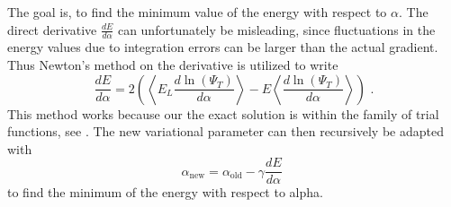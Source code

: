 The goal is, to find the minimum value of the energy with respect to $\alpha$. The direct derivative $\frac{dE}{d\alpha}$ can unfortunately be misleading, since fluctuations in the energy values due to integration errors can be larger than the actual gradient. Thus Newton's method on the derivative is utilized to write
$$\frac{dE}{d\alpha} = 2 \left( \left< E_L \frac{d \ln(\Psi_T)}{d \alpha} \right> - E\left<\frac{d \ln(\Psi_T)}{d \alpha}\right> \right) \text{~.}$$
This method works because our the exact solution is within the family of trial functions, see \cite{JosBook}. %
The new variational parameter can then recursively be adapted with $$\alpha_{\text{new}} = \alpha_{\text{old}} - \gamma \frac{dE}{d\alpha} \text{~} $$
to find the minimum of the energy with respect to alpha.



